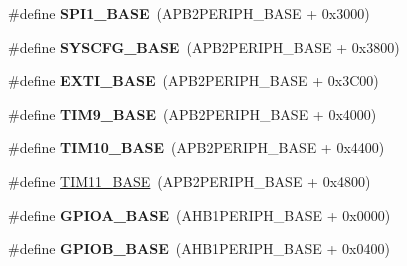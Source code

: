 \begin{DoxyCompactItemize}
\item 
\hypertarget{group___peripheral__memory__map_ga50cd8b47929f18b05efbd0f41253bf8d}{\#define {\bfseries S\-P\-I1\-\_\-\-B\-A\-S\-E}~(A\-P\-B2\-P\-E\-R\-I\-P\-H\-\_\-\-B\-A\-S\-E + 0x3000)}\label{group___peripheral__memory__map_ga50cd8b47929f18b05efbd0f41253bf8d}

\item 
\hypertarget{group___peripheral__memory__map_ga62246020bf3b34b6a4d8d0e84ec79d3d}{\#define {\bfseries S\-Y\-S\-C\-F\-G\-\_\-\-B\-A\-S\-E}~(A\-P\-B2\-P\-E\-R\-I\-P\-H\-\_\-\-B\-A\-S\-E + 0x3800)}\label{group___peripheral__memory__map_ga62246020bf3b34b6a4d8d0e84ec79d3d}

\item 
\hypertarget{group___peripheral__memory__map_ga87371508b3bcdcd98cd1ec629be29061}{\#define {\bfseries E\-X\-T\-I\-\_\-\-B\-A\-S\-E}~(A\-P\-B2\-P\-E\-R\-I\-P\-H\-\_\-\-B\-A\-S\-E + 0x3\-C00)}\label{group___peripheral__memory__map_ga87371508b3bcdcd98cd1ec629be29061}

\item 
\hypertarget{group___peripheral__memory__map_ga92ae902be7902560939223dd765ece08}{\#define {\bfseries T\-I\-M9\-\_\-\-B\-A\-S\-E}~(A\-P\-B2\-P\-E\-R\-I\-P\-H\-\_\-\-B\-A\-S\-E + 0x4000)}\label{group___peripheral__memory__map_ga92ae902be7902560939223dd765ece08}

\item 
\hypertarget{group___peripheral__memory__map_ga3eff32f3801db31fb4b61d5618cad54a}{\#define {\bfseries T\-I\-M10\-\_\-\-B\-A\-S\-E}~(A\-P\-B2\-P\-E\-R\-I\-P\-H\-\_\-\-B\-A\-S\-E + 0x4400)}\label{group___peripheral__memory__map_ga3eff32f3801db31fb4b61d5618cad54a}

\item 
\#define \hyperlink{group___peripheral__memory__map_ga3a4a06bb84c703084f0509e105ffaf1d}{T\-I\-M11\-\_\-\-B\-A\-S\-E}~(A\-P\-B2\-P\-E\-R\-I\-P\-H\-\_\-\-B\-A\-S\-E + 0x4800)
\item 
\hypertarget{group___peripheral__memory__map_gad7723846cc5db8e43a44d78cf21f6efa}{\#define {\bfseries G\-P\-I\-O\-A\-\_\-\-B\-A\-S\-E}~(A\-H\-B1\-P\-E\-R\-I\-P\-H\-\_\-\-B\-A\-S\-E + 0x0000)}\label{group___peripheral__memory__map_gad7723846cc5db8e43a44d78cf21f6efa}

\item 
\hypertarget{group___peripheral__memory__map_gac944a89eb789000ece920c0f89cb6a68}{\#define {\bfseries G\-P\-I\-O\-B\-\_\-\-B\-A\-S\-E}~(A\-H\-B1\-P\-E\-R\-I\-P\-H\-\_\-\-B\-A\-S\-E + 0x0400)}\label{group___peripheral__memory__map_gac944a89eb789000ece920c0f89cb6a68}


\end{DoxyCompactItemize}
